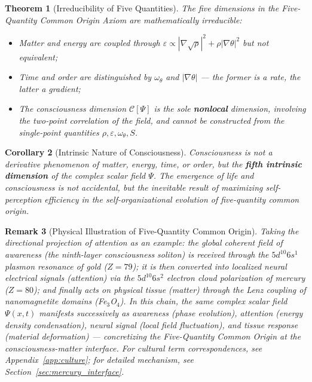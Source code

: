 \documentclass[12pt,a4paper,twocolumn]{article}
\newtheorem{theorem}{Theorem}[section]
\newtheorem{corollary}[theorem]{Corollary}
\newtheorem{remark}[theorem]{Remark}
\begin{document}
\begin{theorem}[Irreducibility of Five Quantities]
The five dimensions in the Five-Quantity Common Origin Axiom are mathematically irreducible:
\begin{itemize}
\item Matter and energy are coupled through $\varepsilon \propto |\nabla\sqrt{\rho}|^2 + \rho|\nabla\theta|^2$ but not equivalent;
\item Time and order are distinguished by $\omega_\theta$ and $|\nabla\theta|$ --- the former is a rate, the latter a gradient;
\item The consciousness dimension $\mathcal{C}[\Psi]$ is the sole \textbf{nonlocal} dimension, involving the two-point correlation of the field, and cannot be constructed from the single-point quantities $\rho, \varepsilon, \omega_\theta, S$.
\end{itemize}
\end{theorem}

\begin{corollary}[Intrinsic Nature of Consciousness]
Consciousness is not a derivative phenomenon of matter, energy, time, or order, but the \textbf{fifth intrinsic dimension} of the complex scalar field $\Psi$. The emergence of life and consciousness is not accidental, but the inevitable result of maximizing self-perception efficiency in the self-organizational evolution of five-quantity common origin.
\end{corollary}

\begin{remark}[Physical Illustration of Five-Quantity Common Origin]
Taking the directional projection of attention as an example: the global coherent field of awareness (the ninth-layer consciousness soliton) is received through the $5d^{10}6s^1$ plasmon resonance of gold ($Z=79$); it is then converted into localized neural electrical signals (attention) via the $5d^{10}6s^2$ electron cloud polarization of mercury ($Z=80$); and finally acts on physical tissue (matter) through the Lenz coupling of nanomagnetite domains (Fe$_3$O$_4$). In this chain, the same complex scalar field $\Psi(x,t)$ manifests successively as awareness (phase evolution), attention (energy density condensation), neural signal (local field fluctuation), and tissue response (material deformation) --- concretizing the Five-Quantity Common Origin at the consciousness-matter interface. For cultural term correspondences, see Appendix~\ref{app:culture}; for detailed mechanism, see Section~\ref{sec:mercury_interface}.
\end{remark}
\end{document}
